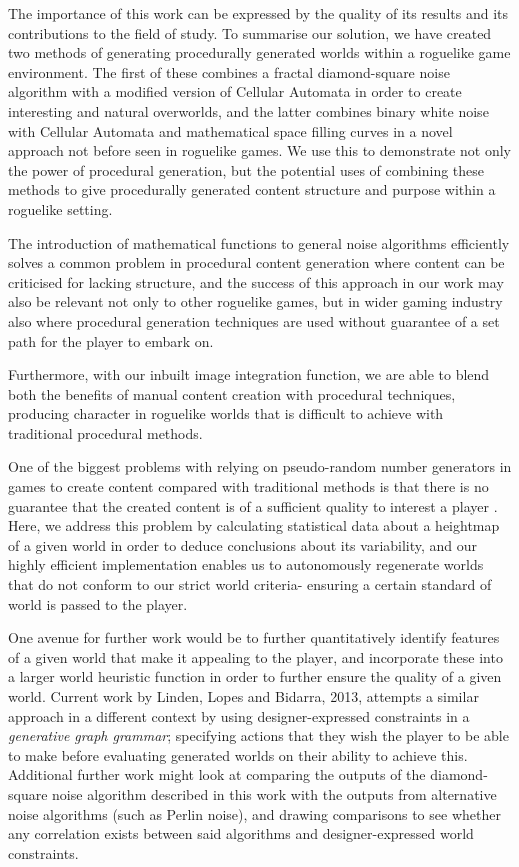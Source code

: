 \documentclass[12pt,a4paper]{article}
\begin{document}
The importance of this work can be expressed by the quality of its results and its contributions to the field of study. To summarise our solution, we have created two methods of generating procedurally generated worlds within a roguelike game environment. The first of these combines a fractal diamond-square noise algorithm with a modified version of Cellular Automata in order to create interesting and natural overworlds, and the latter combines binary white noise with Cellular Automata and mathematical space filling curves in a novel approach not before seen in roguelike games. We use this to demonstrate not only the power of procedural generation, but the potential uses of combining these methods to give procedurally generated content structure and purpose within a roguelike setting. 

The introduction of mathematical functions to general noise algorithms efficiently solves a common problem in procedural content generation where content can be criticised for lacking structure, and the success of this approach in our work may also be relevant not only to other roguelike games, but in wider gaming industry also where procedural generation techniques are used without guarantee of a set path for the player to embark on.   

Furthermore, with our inbuilt image integration function, we are able to blend both the benefits of manual content creation with procedural techniques, producing character in roguelike worlds that is difficult to achieve with traditional procedural methods.

One of the biggest problems with relying on pseudo-random number generators in games to create content compared with traditional methods is that there is no guarantee that the created content is of a sufficient quality to interest a player \cite{risi2014automatically}. Here, we address this problem by calculating statistical data about a heightmap of a given world in order to deduce conclusions about its variability, and our highly efficient implementation enables us to autonomously regenerate worlds that do not conform to our strict world criteria- ensuring a certain standard of world is passed to the player. 

One avenue for further work would be to further quantitatively identify features of a given world that make it appealing to the player, and incorporate these into a larger world heuristic function in order to further ensure the quality of a given world. Current work by Linden, Lopes and Bidarra, 2013, attempts a similar approach in a different context by using designer-expressed constraints in a \emph{generative graph grammar}; specifying actions that they wish the player to be able to make before evaluating generated worlds on their ability to achieve this. Additional further work might look at comparing the outputs of the diamond-square noise algorithm described in this work with the outputs from alternative noise algorithms (such as Perlin noise), and drawing comparisons to see whether any correlation exists between said algorithms and designer-expressed world constraints.   
\end{document}
